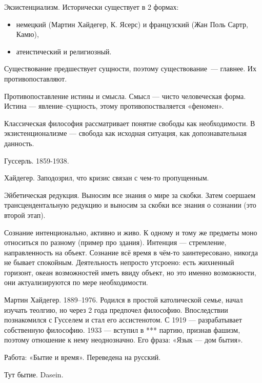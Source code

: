 Экзистенциализм.
Исторически существует в 2 формах:
\begin{itemize}
	\item немецкий (Мартин Хайдегер, К. Ясерс) и французский (Жан Поль Сартр, Камю),
	\item атеистический и религиозный.
\end{itemize}

Существование предшествует сущности, поэтому существование~--- главнее. Их противопоставляют.

Противопоставление истины и смысла. Смысл --- чисто человеческая форма. Истина --- явление--сущность, этому противопостваляется «феномен».

Классическая философия рассматривает понятие свободы как необходимости. В экзистенционализме --- свобода как исходная ситуация, как допознавательная данность.

Гуссерль. 1859-1938.

Хайдегер. Заподозрил, что кризис связан с чем-то пропущенным.

Эйбетическая редукция. Выносим все знания о мире за скобки. Затем соершаем трансцендентальную редукцию и выносим за скобки все знания о сознании (это второй этап).

Сознание интенционально, активно и живо. К одному и тому же предметы моно относиться по разному (пример про здания).
Интенция --- стремление, направленность на объект. Сознание всё время в чём-то заинтересовано, никогда не бывает спокойным. Деятельность непросто утсроено: есть жихненный горизонт, океан возможностей иметь ввиду объект, но это именно возможности, они актуализируются по мере необходимости.

Мартин Хайдегер. 1889--1976. Родился в простой католической семье, начал изучать теолгию, но через 2 года предпочел философию. Впоследствии познакомился с Гусселем и стал его ассистенотом. С 1919 --- разрабатывает собственную философию.
1933 --- вступил в *** партию, признав фашизм, поэтому отношение к нему неоднозначно.
Его фраза: «Язык --- дом бытия».

Работа: «Бытие и время». Переведена на русский.

Тут бытие. Dasein.\\

